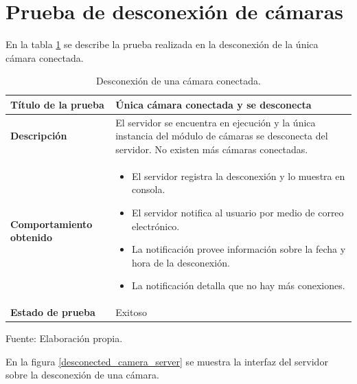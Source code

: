 \section{Prueba de desconexión de cámaras}

En la tabla \ref{desconected_camera} se describe la prueba realizada en la desconexión de la única cámara conectada.

\begin{table}[H]
    \caption{Desconexión de una cámara conectada.}
    \begin{center}
        \begin{tabular}{|>{\centering}p{}|m{}<{\centering}|} 
            \hline
            \textbf{Título de la prueba} & \textbf{Única cámara conectada y se desconecta} \\
            \hline
            \textbf{Descripción} & El servidor se encuentra en ejecución y la única instancia del módulo de cámaras se desconecta del servidor. No existen más cámaras conectadas.\\
            \hline
            \textbf{Comportamiento obtenido} & 
            \begin{itemize}
                \item El servidor registra la desconexión y lo muestra en consola.
                \item El servidor notifica al usuario por medio de correo electrónico.
                \item La notificación provee información sobre la fecha y hora de la desconexión.
                \item La notificación detalla que no hay más conexiones.
            \end{itemize} \\ 
            \hline
            \textbf{Estado de prueba} & Exitoso \\
            \hline
        \end{tabular}
    \end{center}
    \begin{center}
        Fuente: Elaboración propia.
        \label{desconected_camera}
    \end{center}
\end{table}

En la figura \ref{desconected_camera_server} se muestra la interfaz del servidor sobre la desconexión de una cámara.

